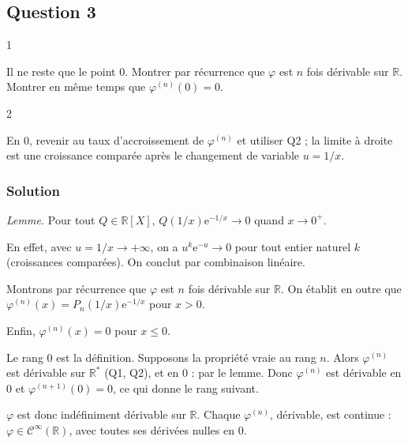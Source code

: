 \documentclass[11pt,a4paper]{article}
\newcommand{\equationajustee}[1]{%
  \sbox{\boiteequation}{$\displaystyle #1$}%
  \ifdim\wd\boiteequation>\linewidth
    \[\resizebox{\linewidth}{!}{\usebox{\boiteequation}}\]%
  \else
    \[#1\]%
  \fi}
\begin{document}
\hypertarget{question-3}{%
\subsection{Question 3}\label{question-3}}

\begin{indication}{1}

Il ne reste que le point \(0\). Montrer par récurrence que \(\varphi\) est \(n\) fois dérivable sur \(\mathbb R\). Montrer en même temps que \(\varphi^{(n)}(0)=0\).

\end{indication}

\begin{indication}{2}

En \(0\), revenir au taux d'accroissement de \(\varphi^{(n)}\) et utiliser Q2 ; la limite à droite est une croissance comparée après le changement de variable \(u=1/x\).

\end{indication}

\hypertarget{solution-2}{%
\subsubsection{Solution}\label{solution-2}}

\emph{Lemme.} Pour tout \(Q\in\mathbb R[X]\), \(Q(1/x)\mathrm e^{-1/x}\to0\) quand \(x\to0^+\).

En effet, avec \(u=1/x\to+\infty\), on a \(u^k\mathrm e^{-u}\to0\) pour tout entier naturel \(k\) (croissances comparées). On conclut par combinaison linéaire.

Montrons par récurrence que \(\varphi\) est \(n\) fois dérivable sur \(\mathbb R\). On établit en outre que \(\varphi^{(n)}(x)=P_n(1/x)\mathrm e^{-1/x}\) pour \(x>0\).

Enfin, \(\varphi^{(n)}(x)=0\) pour \(x\leqslant0\).

Le rang \(0\) est la définition. Supposons la propriété vraie au rang \(n\). Alors \(\varphi^{(n)}\) est dérivable sur \(\mathbb R^*\) (Q1, Q2), et en \(0\) :
\equationajustee{\frac{\varphi^{(n)}(x)-\varphi^{(n)}(0)}{x}=\begin{cases}(XP_n)(1/x)\,\mathrm e^{-1/x}&x>0\\ 0&x<0\end{cases}\xrightarrow[x\to0]{}0}
par le lemme. Donc \(\varphi^{(n)}\) est dérivable en \(0\) et \(\varphi^{(n+1)}(0)=0\), ce qui donne le rang suivant.

\(\varphi\) est donc indéfiniment dérivable sur \(\mathbb R\). Chaque \(\varphi^{(n)}\), dérivable, est continue : \textbf{\(\varphi\in\mathcal C^\infty(\mathbb R)\)}, avec toutes ses dérivées nulles en \(0\).
\end{document}
